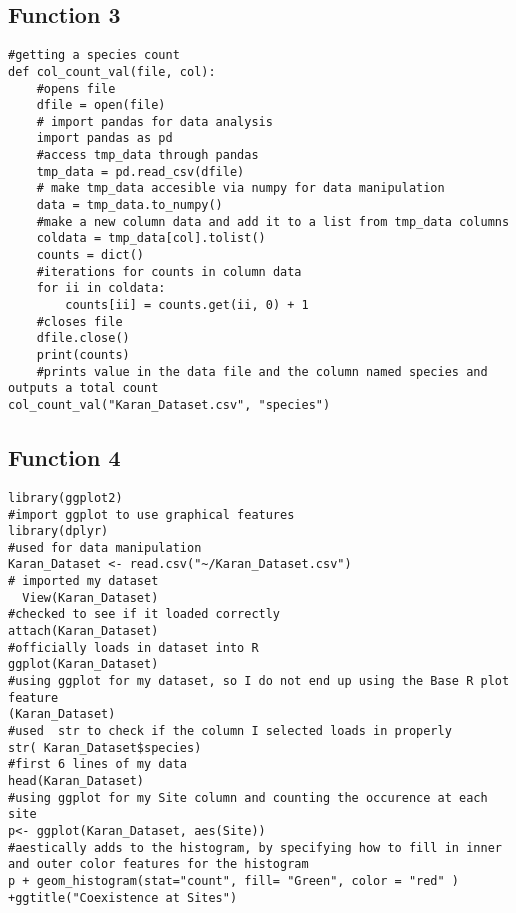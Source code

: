 \documentclass[letterpaper]{article}
\begin{document}
\subsection{Function 3 }
\begin{verbatim}
#getting a species count
def col_count_val(file, col):
    #opens file
    dfile = open(file)
    # import pandas for data analysis
    import pandas as pd
    #access tmp_data through pandas
    tmp_data = pd.read_csv(dfile)
    # make tmp_data accesible via numpy for data manipulation
    data = tmp_data.to_numpy()
    #make a new column data and add it to a list from tmp_data columns
    coldata = tmp_data[col].tolist()
    counts = dict()
    #iterations for counts in column data
    for ii in coldata:
        counts[ii] = counts.get(ii, 0) + 1
    #closes file
    dfile.close()
    print(counts)
    #prints value in the data file and the column named species and outputs a total count
col_count_val("Karan_Dataset.csv", "species")

\end{verbatim}

\subsection{Function 4}
\begin{verbatim}
library(ggplot2)
#import ggplot to use graphical features
library(dplyr)
#used for data manipulation
Karan_Dataset <- read.csv("~/Karan_Dataset.csv")
# imported my dataset
  View(Karan_Dataset)
#checked to see if it loaded correctly
attach(Karan_Dataset)
#officially loads in dataset into R
ggplot(Karan_Dataset)
#using ggplot for my dataset, so I do not end up using the Base R plot feature
(Karan_Dataset)
#used  str to check if the column I selected loads in properly
str( Karan_Dataset$species)
#first 6 lines of my data
head(Karan_Dataset)
#using ggplot for my Site column and counting the occurence at each site
p<- ggplot(Karan_Dataset, aes(Site))
#aestically adds to the histogram, by specifying how to fill in inner and outer color features for the histogram
p + geom_histogram(stat="count", fill= "Green", color = "red" ) +ggtitle("Coexistence at Sites")
\end{verbatim}
\end{document}
